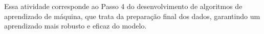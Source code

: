 Essa atividade corresponde ao Passo 4 do desenvolvimento de algoritmos de aprendizado de máquina, que trata da preparação final dos dados, garantindo um aprendizado mais robusto e eficaz do modelo.






